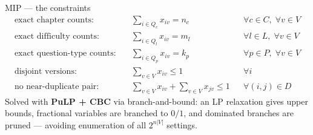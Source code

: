 \documentclass[11pt,aspectratio=169]{beamer}
\begin{document}
\begin{frame}{MIP — the constraints}
  \begin{align*}
    \text{exact chapter counts:}\quad & \sum_{i\in Q_c} x_{iv}=n_c
      && \forall c\in C,\;\forall v\in V \\[1mm]
    \text{exact difficulty counts:}\quad & \sum_{i\in Q_l} x_{iv}=m_l
      && \forall l\in L,\;\forall v\in V \\[1mm]
    \text{exact question-type counts:}\quad & \sum_{i\in Q_p} x_{iv}=k_p
      && \forall p\in P,\;\forall v\in V \\[1mm]
    \text{disjoint versions:}\quad & \sum_{v\in V} x_{iv}\le 1
      && \forall i \\[1mm]
    \text{no near-duplicate pair:}\quad & \sum_{v\in V}x_{iv}+\sum_{v\in V}x_{jv}\le 1
      && \forall (i,j)\in D
  \end{align*}
  \vspace{1mm}
  \footnotesize Solved with \textbf{PuLP + CBC} via branch-and-bound: an LP
  relaxation gives upper bounds, fractional variables are branched to $0/1$, and
  dominated branches are pruned — avoiding enumeration of all $2^{n|V|}$
  settings.
\end{frame}
\end{document}

